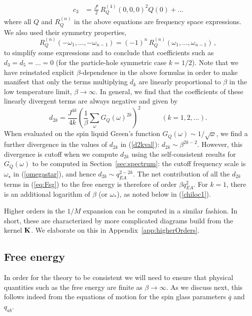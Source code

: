 \documentclass[aps,prx,preprint,onecolumn,citeautoscript,superscriptaddress,nofootinbib,
eqsecnum]{revtex4}
\begin{document}
{\begin{equation}
\begin{split}
        c_3 &= \frac{J^8}{2} \, R_Q^{(4)}(0,0,0)^2 Q(0)+ \ldots
    \end{split}
\end{equation}
where all $Q$ and $R_Q^{(n)}$ in the above equations are frequency space expressions. We also used their symmetry properties,
\begin{equation}
 R_Q^{(n)}(-\omega_1,\ldots,-\omega_{n-1})=  (-1)^n \, R_Q^{(n)}(\omega_1,\ldots,\omega_{n-1}) \,,
\end{equation}
to simplify some expressions and to conclude that coefficients such as $d_3 = d_5 = \ldots = 0$ (for the particle-hole symmetric case $k=1/2$). Note that we have reinstated explicit $\beta$-dependence in the above formulas in order to make manifest that only the terms multiplying $d_k$ are linearly proportional to $\beta$ in the low temperature limit, $\beta \rightarrow \infty$. In general, we find that the coefficients of these linearly divergent terms are always negative and given by
\begin{equation}
 d_{2k} = \frac{J^{4k}}{4k} \left( \frac{1}{\beta}\sum_\omega G_Q(\omega)^{2k} \right)^2 \qquad\quad (k = 1,2,\ldots). \label{d2kval}
\end{equation}
When evaluated on the spin liquid Green's function $G_Q (\omega) \sim 1/\sqrt{\omega}$, we find a further divergence in the values of $d_{2k}$
in (\ref{d2kval}): $d_{2k} \sim \beta^{2k-2}$. However, this divergence is cutoff when we compute $d_{2k}$ using the self-consistent results for $G_Q (\omega) $ to be computed in Section~\ref{sec:spectrum}: the cutoff frequency scale is $\omega_\star$ in (\ref{omegastar}), and hence $d_{2k} \sim q_{EA}^{2-2k}$. The net contribution of all the $d_{2k}$ terms in (\ref{eq:Fsg}) to the free energy is therefore of order $\beta q_{EA}^2$.
For $k=1$, there is an additional logarithm of $\beta$ (or $\omega_\ast$), as noted below in (\ref{chiloc1}).

Higher orders in the $1/M$ expansion can be computed in a similar fashion. In short, these are characterized by more complicated diagrams build from the kernel ${\bf K}$. We elaborate on this in Appendix~\ref{app:higherOrders}. 




\subsection{Free energy}
\label{sec:freeen}

In order for the theory to be consistent we will need to ensure that physical quantities such as the free energy are finite as $\beta \rightarrow \infty$. As we discuss next, this follows indeed from the equations of motion for the spin glass parameters $\overline{q}$ and $q_{ab}$.

}
\end{document}
